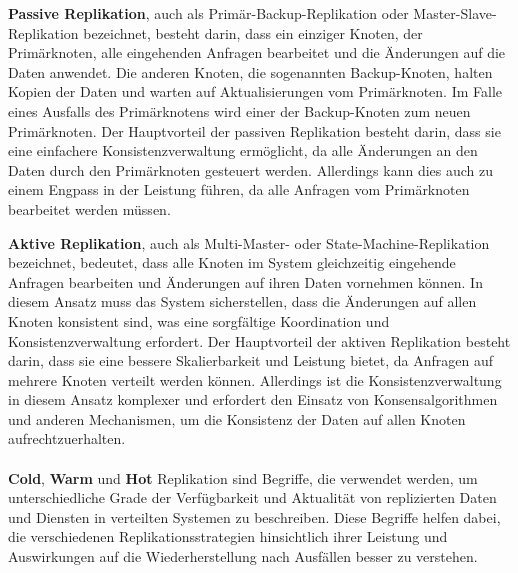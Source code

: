 \textbf{Passive Replikation}, auch als Primär-Backup-Replikation oder Master-Slave-Replikation bezeichnet, besteht darin, dass ein einziger Knoten, der Primärknoten, alle eingehenden Anfragen bearbeitet und die Änderungen auf die Daten anwendet. Die anderen Knoten, die sogenannten Backup-Knoten, halten Kopien der Daten und warten auf Aktualisierungen vom Primärknoten. Im Falle eines Ausfalls des Primärknotens wird einer der Backup-Knoten zum neuen Primärknoten. Der Hauptvorteil der passiven Replikation besteht darin, dass sie eine einfachere Konsistenzverwaltung ermöglicht, da alle Änderungen an den Daten durch den Primärknoten gesteuert werden. Allerdings kann dies auch zu einem Engpass in der Leistung führen, da alle Anfragen vom Primärknoten bearbeitet werden müssen.

\textbf{Aktive Replikation}, auch als Multi-Master- oder State-Machine-Replikation bezeichnet, bedeutet, dass alle Knoten im System gleichzeitig eingehende Anfragen bearbeiten und Änderungen auf ihren Daten vornehmen können. In diesem Ansatz muss das System sicherstellen, dass die Änderungen auf allen Knoten konsistent sind, was eine sorgfältige Koordination und Konsistenzverwaltung erfordert. Der Hauptvorteil der aktiven Replikation besteht darin, dass sie eine bessere Skalierbarkeit und Leistung bietet, da Anfragen auf mehrere Knoten verteilt werden können. Allerdings ist die Konsistenzverwaltung in diesem Ansatz komplexer und erfordert den Einsatz von Konsensalgorithmen und anderen Mechanismen, um die Konsistenz der Daten auf allen Knoten aufrechtzuerhalten.
\\\\
\textbf{Cold}, \textbf{Warm} und \textbf{Hot} Replikation sind Begriffe, die verwendet werden, um unterschiedliche Grade der Verfügbarkeit und Aktualität von replizierten Daten und Diensten in verteilten Systemen zu beschreiben. Diese Begriffe helfen dabei, die verschiedenen Replikationsstrategien hinsichtlich ihrer Leistung und Auswirkungen auf die Wiederherstellung nach Ausfällen besser zu verstehen.
